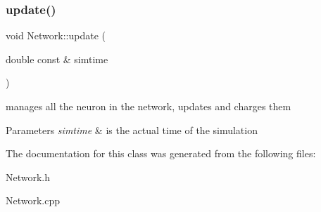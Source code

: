 \subsubsection{\texorpdfstring{update()}{update()}}
{\footnotesize\ttfamily void Network\+::update (\begin{DoxyParamCaption}\item[{double const \&}]{simtime }\end{DoxyParamCaption})}

manages all the neuron in the network, updates and charges them 
\begin{DoxyParams}{Parameters}
{\em simtime} & is the actual time of the simulation \\
\hline
\end{DoxyParams}


The documentation for this class was generated from the following files\+:\begin{DoxyCompactItemize}
\item 
Network.\+h\item 
Network.\+cpp\end{DoxyCompactItemize}
